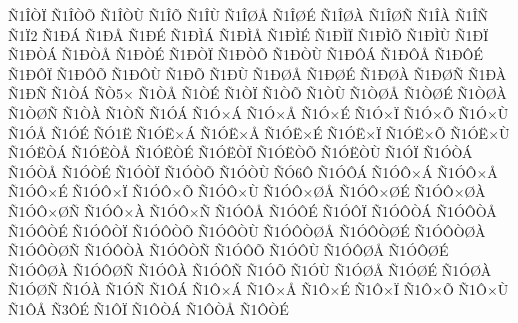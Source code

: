 {^^d11^^ce^^d2^^cf
^^d11^^ce^^d2^^d5
^^d11^^ce^^d2^^d9
^^d11^^ce^^d5
^^d11^^ce^^d9
^^d11^^ce^^d8^^c5
^^d11^^ce^^d8^^c9
^^d11^^ce^^d8^^c0
^^d11^^ce^^d8^^d1
^^d11^^ce^^c0
^^d11^^ce^^d1
^^d11^^cf2
^^d11^^d0^^c1
^^d11^^d0^^c5
^^d11^^d0^^c9
^^d11^^d0^^cc^^c1
^^d11^^d0^^cc^^c5
^^d11^^d0^^cc^^c9
^^d11^^d0^^cc^^cf
^^d11^^d0^^cc^^d5
^^d11^^d0^^cc^^d9
^^d11^^d0^^cf
^^d11^^d0^^d2^^c1
^^d11^^d0^^d2^^c5
^^d11^^d0^^d2^^c9
^^d11^^d0^^d2^^cf
^^d11^^d0^^d2^^d5
^^d11^^d0^^d2^^d9
^^d11^^d0^^d4^^c1
^^d11^^d0^^d4^^c5
^^d11^^d0^^d4^^c9
^^d11^^d0^^d4^^cf
^^d11^^d0^^d4^^d5
^^d11^^d0^^d4^^d9
^^d11^^d0^^d5
^^d11^^d0^^d9
^^d11^^d0^^d8^^c5
^^d11^^d0^^d8^^c9
^^d11^^d0^^d8^^c0
^^d11^^d0^^d8^^d1
^^d11^^d0^^c0
^^d11^^d0^^d1
^^d11^^d2^^c1
^^d1^^d25^^d7
^^d11^^d2^^c5
^^d11^^d2^^c9
^^d11^^d2^^cf
^^d11^^d2^^d5
^^d11^^d2^^d9
^^d11^^d2^^d8^^c5
^^d11^^d2^^d8^^c9
^^d11^^d2^^d8^^c0
^^d11^^d2^^d8^^d1
^^d11^^d2^^c0
^^d11^^d2^^d1
^^d11^^d3^^c1
^^d11^^d3^^d7^^c1
^^d11^^d3^^d7^^c5
^^d11^^d3^^d7^^c9
^^d11^^d3^^d7^^cf
^^d11^^d3^^d7^^d5
^^d11^^d3^^d7^^d9
^^d11^^d3^^c5
^^d11^^d3^^c9
^^d1^^d31^^cb
^^d11^^d3^^cb^^d7^^c1
^^d11^^d3^^cb^^d7^^c5
^^d11^^d3^^cb^^d7^^c9
^^d11^^d3^^cb^^d7^^cf
^^d11^^d3^^cb^^d7^^d5
^^d11^^d3^^cb^^d7^^d9
^^d11^^d3^^cb^^d2^^c1
^^d11^^d3^^cb^^d2^^c5
^^d11^^d3^^cb^^d2^^c9
^^d11^^d3^^cb^^d2^^cf
^^d11^^d3^^cb^^d2^^d5
^^d11^^d3^^cb^^d2^^d9
^^d11^^d3^^cf
^^d11^^d3^^d2^^c1
^^d11^^d3^^d2^^c5
^^d11^^d3^^d2^^c9
^^d11^^d3^^d2^^cf
^^d11^^d3^^d2^^d5
^^d11^^d3^^d2^^d9
^^d1^^d36^^d4
^^d11^^d3^^d4^^c1
^^d11^^d3^^d4^^d7^^c1
^^d11^^d3^^d4^^d7^^c5
^^d11^^d3^^d4^^d7^^c9
^^d11^^d3^^d4^^d7^^cf
^^d11^^d3^^d4^^d7^^d5
^^d11^^d3^^d4^^d7^^d9
^^d11^^d3^^d4^^d7^^d8^^c5
^^d11^^d3^^d4^^d7^^d8^^c9
^^d11^^d3^^d4^^d7^^d8^^c0
^^d11^^d3^^d4^^d7^^d8^^d1
^^d11^^d3^^d4^^d7^^c0
^^d11^^d3^^d4^^d7^^d1
^^d11^^d3^^d4^^c5
^^d11^^d3^^d4^^c9
^^d11^^d3^^d4^^cf
^^d11^^d3^^d4^^d2^^c1
^^d11^^d3^^d4^^d2^^c5
^^d11^^d3^^d4^^d2^^c9
^^d11^^d3^^d4^^d2^^cf
^^d11^^d3^^d4^^d2^^d5
^^d11^^d3^^d4^^d2^^d9
^^d11^^d3^^d4^^d2^^d8^^c5
^^d11^^d3^^d4^^d2^^d8^^c9
^^d11^^d3^^d4^^d2^^d8^^c0
^^d11^^d3^^d4^^d2^^d8^^d1
^^d11^^d3^^d4^^d2^^c0
^^d11^^d3^^d4^^d2^^d1
^^d11^^d3^^d4^^d5
^^d11^^d3^^d4^^d9
^^d11^^d3^^d4^^d8^^c5
^^d11^^d3^^d4^^d8^^c9
^^d11^^d3^^d4^^d8^^c0
^^d11^^d3^^d4^^d8^^d1
^^d11^^d3^^d4^^c0
^^d11^^d3^^d4^^d1
^^d11^^d3^^d5
^^d11^^d3^^d9
^^d11^^d3^^d8^^c5
^^d11^^d3^^d8^^c9
^^d11^^d3^^d8^^c0
^^d11^^d3^^d8^^d1
^^d11^^d3^^c0
^^d11^^d3^^d1
^^d11^^d4^^c1
^^d11^^d4^^d7^^c1
^^d11^^d4^^d7^^c5
^^d11^^d4^^d7^^c9
^^d11^^d4^^d7^^cf
^^d11^^d4^^d7^^d5
^^d11^^d4^^d7^^d9
^^d11^^d4^^c5
^^d13^^d4^^c9
^^d11^^d4^^cf
^^d11^^d4^^d2^^c1
^^d11^^d4^^d2^^c5
^^d11^^d4^^d2^^c9
}
